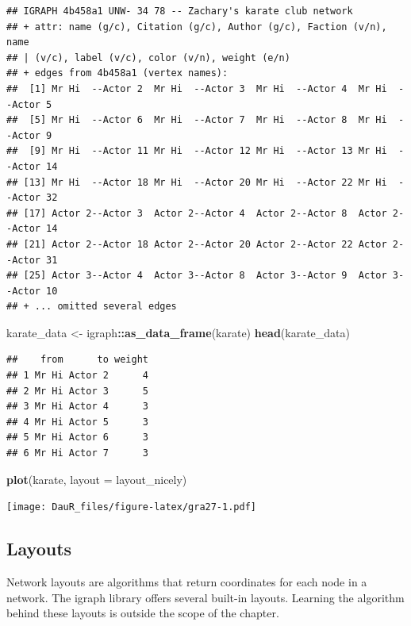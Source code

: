 \documentclass[
]{book}
\newenvironment{Shaded}{\begin{snugshade}}{\end{snugshade}}
\newcommand{\AttributeTok}[1]{\textcolor[rgb]{0.13,0.29,0.53}{#1}}
\newcommand{\FunctionTok}[1]{\textcolor[rgb]{0.13,0.29,0.53}{\textbf{#1}}}
\newcommand{\NormalTok}[1]{#1}
\newcommand{\OtherTok}[1]{\textcolor[rgb]{0.56,0.35,0.01}{#1}}
\newcommand{\SpecialCharTok}[1]{\textcolor[rgb]{0.81,0.36,0.00}{\textbf{#1}}}
\begin{document}
\begin{verbatim}
## IGRAPH 4b458a1 UNW- 34 78 -- Zachary's karate club network
## + attr: name (g/c), Citation (g/c), Author (g/c), Faction (v/n), name
## | (v/c), label (v/c), color (v/n), weight (e/n)
## + edges from 4b458a1 (vertex names):
##  [1] Mr Hi  --Actor 2  Mr Hi  --Actor 3  Mr Hi  --Actor 4  Mr Hi  --Actor 5 
##  [5] Mr Hi  --Actor 6  Mr Hi  --Actor 7  Mr Hi  --Actor 8  Mr Hi  --Actor 9 
##  [9] Mr Hi  --Actor 11 Mr Hi  --Actor 12 Mr Hi  --Actor 13 Mr Hi  --Actor 14
## [13] Mr Hi  --Actor 18 Mr Hi  --Actor 20 Mr Hi  --Actor 22 Mr Hi  --Actor 32
## [17] Actor 2--Actor 3  Actor 2--Actor 4  Actor 2--Actor 8  Actor 2--Actor 14
## [21] Actor 2--Actor 18 Actor 2--Actor 20 Actor 2--Actor 22 Actor 2--Actor 31
## [25] Actor 3--Actor 4  Actor 3--Actor 8  Actor 3--Actor 9  Actor 3--Actor 10
## + ... omitted several edges
\end{verbatim}

\begin{Shaded}
\begin{Highlighting}[]
\NormalTok{karate\_data }\OtherTok{\textless{}{-}}\NormalTok{ igraph}\SpecialCharTok{::}\FunctionTok{as\_data\_frame}\NormalTok{(karate)}
\FunctionTok{head}\NormalTok{(karate\_data)}
\end{Highlighting}
\end{Shaded}

\begin{verbatim}
##    from      to weight
## 1 Mr Hi Actor 2      4
## 2 Mr Hi Actor 3      5
## 3 Mr Hi Actor 4      3
## 4 Mr Hi Actor 5      3
## 5 Mr Hi Actor 6      3
## 6 Mr Hi Actor 7      3
\end{verbatim}

\begin{Shaded}
\begin{Highlighting}[]
\FunctionTok{plot}\NormalTok{(karate, }\AttributeTok{layout =}\NormalTok{ layout\_nicely)}
\end{Highlighting}
\end{Shaded}

\texttt{[image: DauR\_files/figure-latex/gra27-1.pdf]}

\hypertarget{layouts}{%
\subsection{Layouts}\label{layouts}}

Network layouts are algorithms that return coordinates for each node in a network. The igraph library offers several built-in layouts. Learning the algorithm behind these layouts is outside the scope of the chapter.
\end{document}
